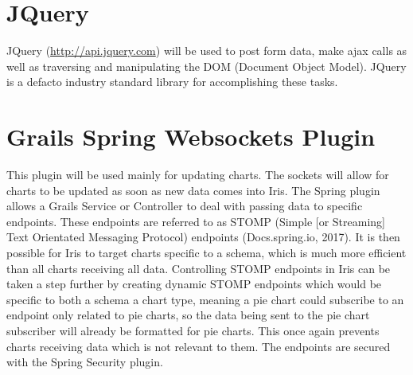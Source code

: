 \documentclass[12pt,a4paper,titlepage]{report}
\begin{document}
\section{JQuery}
JQuery (\url{http://api.jquery.com}) will be used to post form data, make ajax calls as well as traversing and manipulating the DOM (Document Object Model). JQuery is a defacto industry standard library for accomplishing these tasks.

\section{Grails Spring Websockets Plugin}
This plugin will be used mainly for updating charts. The sockets will allow for charts to be updated as soon as new data comes into Iris. The Spring plugin allows a Grails Service or Controller to deal with passing data to specific endpoints. These endpoints are referred to as STOMP (Simple [or Streaming] Text Orientated Messaging Protocol) endpoints (Docs.spring.io, 2017). It is then possible for Iris to target charts specific to a schema, which is much more efficient than all charts receiving all data. Controlling STOMP endpoints in Iris can be taken a step further by creating dynamic STOMP endpoints which would be specific to both a schema a chart type, meaning a pie chart could subscribe to an endpoint only related to pie charts, so the data being sent to the pie chart subscriber will already be formatted for pie charts. This once again prevents charts receiving data which is not relevant to them. The endpoints are secured with the Spring Security plugin.
\end{document}
